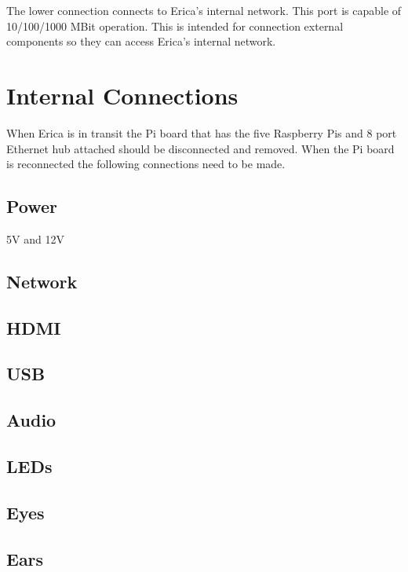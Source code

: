 The lower connection connects to Erica's internal network.  This port is capable of 10/100/1000 MBit operation.  This is intended for connection external components so they can access Erica's internal network.


\section{Internal Connections}
When Erica is in transit the Pi board that has the five Raspberry Pis and 8 port Ethernet hub attached should be disconnected and removed.  When the Pi board is reconnected the following connections need to be made.

\subsection{Power}
5V and 12V

\subsection{Network}

\subsection{HDMI}

\subsection{USB}

\subsection{Audio}

\subsection{LEDs}

\subsection{Eyes}

\subsection{Ears}
